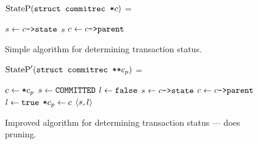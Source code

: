 \documentclass[11pt,notitlepage]{article}
\newcommand{\ptr}{\code{->}}
\begin{document}
\begin{figure}
$\text{StateP}(\texttt{struct commitrec *} c)$ =
\begin{myalgorithmic}
\LOOP
    \RETURN {}
  \ENDIF
  \STATE $s \gets c \ptr\code{state}$
    \RETURN $s$
  \ENDIF
  \STATE $c \gets c \ptr \code{parent}$
\ENDLOOP*
\end{myalgorithmic}
\caption{Simple algorithm for determining transaction status.}
\label{fig:statep}
\end{figure}

\begin{figure}
$\text{StateP}'(\texttt{struct commitrec **} c_p)$ =
\begin{myalgorithmic}
\STATE $c \gets \texttt{*}c_p$
\STATE $s \gets \texttt{COMMITTED}$
\STATE $l \gets \texttt{false}$
  \STATE $s \gets c\ptr\code{state}$ 
    \BREAK
  \ENDIF
  \STATE $c \gets c \ptr \code{parent}$
  \STATE $l \gets \texttt{true}$
\ENDWHILE
{}
  \STATE $\texttt{*}c_p \gets c$ 
\ENDIF
\RETURN $\left\langle s,l \right\rangle$
\end{myalgorithmic}
\caption{Improved algorithm for determining transaction status ---
         does pruning.}
\label{fig:statepprime}
\end{figure}
\end{document}
